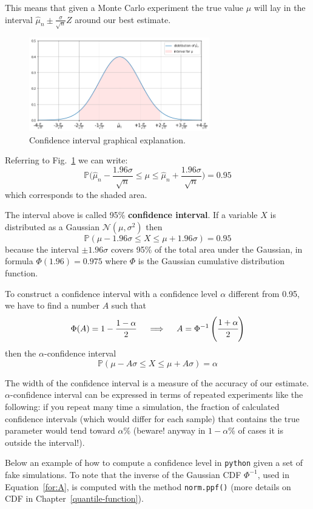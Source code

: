This means that given a Monte Carlo experiment the true value $\mu$ will lay in the interval $\hat{\mu}_n \pm  \frac{\sigma}{\sqrt{n}}Z$ around our best estimate. 
\begin{figure}[h]
	\centering
	\includegraphics[width=0.7\textwidth]{confidence_interval.png}
	\caption{Confidence interval graphical explanation.}
	\label{fig:confidence}
\end{figure}
Referring to Fig.~\ref{fig:confidence} we can write:
\[\mathbb{P}\Big(\hat{\mu}_n - \frac{1.96\sigma}{\sqrt{n}} \le \mu \le \hat{\mu}_n + \frac{1.96\sigma}{\sqrt{n}}\Big) = 0.95 \]
which corresponds to the shaded area.

The interval above is called 95\% \textbf{confidence interval}. If a variable $X$ is distributed as a Gaussian $\mathcal{N}(\mu, \sigma^2)$ then
\[\mathbb{P}(\mu - 1.96\sigma \le X \le \mu+ 1.96\sigma) = 0.95 \]
because the interval $\pm 1.96\sigma$ covers 95\% of the total area under the Gaussian, in formula $\Phi(1.96)=0.975$ where $\Phi$ is the Gaussian cumulative distribution function.

To construct a confidence interval with a confidence level $\alpha$ different from 0.95, we have to find a number $A$ such that
\begin{equation}
	\Phi(A) = 1 - \frac{1-\alpha}{2}\quad\implies\quad A = \Phi^{-1}\left(\cfrac{1+\alpha}{2}\right)
	\label{for:A}
\end{equation}
then the $\alpha$-confidence interval
\[\mathbb{P}(\mu - A\sigma \le X \le \mu+ A\sigma) = \alpha \]

The width of the confidence interval is a measure of the accuracy of our estimate.
$\alpha$-confidence interval can be expressed in terms of repeated
experiments like the following: if you repeat many time a simulation,
the fraction of calculated confidence intervals (which would differ for each sample) that contains
the true parameter would tend toward $\alpha \%$ (beware! anyway in $1-\alpha\%$ of cases it is outside the interval!).

Below an example of how to compute a confidence level in \texttt{python} given a set of fake simulations. To note that the inverse of the Gaussian CDF $\Phi^{-1}$, used in Equation~\ref{for:A}, is computed with the method \texttt{norm.ppf()} (more details on CDF in Chapter~\ref{quantile-function}).

